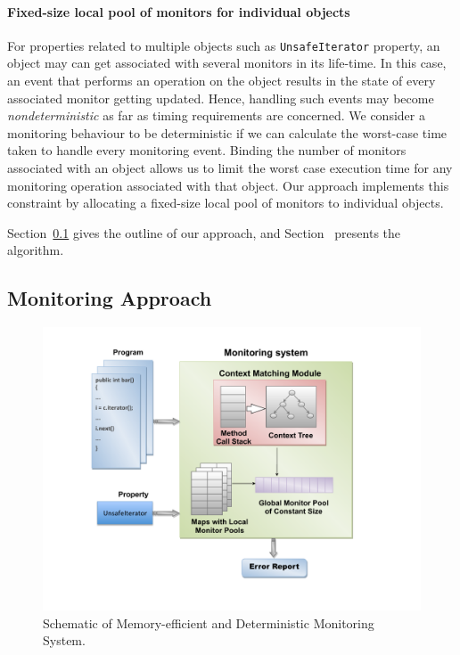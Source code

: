 \paragraph{Fixed-size local pool of monitors for individual objects} For 
properties related to multiple objects such as \texttt{UnsafeIterator} property, 
an object may can get associated with several monitors in its life-time. In this 
case, an event that performs an operation on the object results in the state of 
every associated monitor getting updated. Hence, handling such events may become 
\textit{nondeterministic} as far as timing requirements are concerned. We 
consider a monitoring behaviour to be deterministic if we can calculate the 
worst-case time taken to handle every monitoring event. Binding the number of 
monitors associated with an object allows us to limit the worst case execution 
time for any monitoring operation associated with that object. Our approach 
implements this constraint by allocating a fixed-size local pool of monitors to 
individual objects.

Section~\ref{subsec:outline} gives the outline of our approach, and 
Section~\label{subsec:algorithm} presents the algorithm.

\subsection{Monitoring Approach}
\label{subsec:outline}

\begin{figure}[t]
\centering
  \includegraphics[scale=0.4, trim= 2cm 1cm 0 1cm]{./images/schematic.pdf}
  \caption[Schematic of Memory-efficient and Deterministic Monitoring 
System]{Schematic of Memory-efficient and Deterministic Monitoring System.}
  \label{fig:schematic}
\end{figure}

